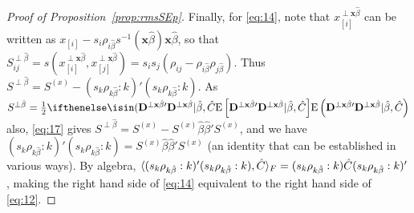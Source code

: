\documentclass{article}
\theoremstyle{remark}
\begin{document}
\begin{proof}[Proof of Proposition~\ref{prop:rmsSEp}]
Finally, for \eqref{eq:14}, note that $x_{[i]}^{\perp \mathbf{x}\hat\beta}$ can be written as  $x_{[i]} - s_{i}\rho_{i\hat\beta}s^{-1}(\mathbf{x}\hat\beta) \mathbf{x}\hat\beta $, so that  $S^{\perp \hat{\beta}}_{ij} =
 s(x_{[i]}^{\perp \mathbf{x}\hat\beta}, x_{[j]}^{\perp \mathbf{x}\hat\beta}) = s_{i} s_{j} (\rho_{ij} - \rho_{i\hat\beta}\rho_{j\hat\beta})$.  Thus $S^{\perp \hat{\beta}} = S^{(x)} - (s_{k} \rho_{k \hat\beta}: k )' (s_{k} \rho_{k \hat\beta}: k) $.  As $S^{\perp \hat{\beta}} = \frac{1}{2}\E{\mathbf{D}^{\perp \mathbf{x}\hat{\beta}\prime}\mathbf{D}^{\perp \mathbf{x}\hat{\beta}} | \hat\beta, \hat{C}}$ also, \eqref{eq:17} gives $S^{\perp \hat{\beta}} = S^{(x)} - S^{(x)}\hat\beta\hat\beta'S^{(x)} $, and we have $ (s_{k} \rho_{k \hat\beta}: k )' (s_{k} \rho_{k \hat\beta}: k)= S^{(x)}\hat\beta\hat\beta'S^{(x)} $
(an identity that can be established in various ways).  By algebra, $\langle (s_{k} \rho_{k \hat\beta}: k )' (s_{k} \rho_{k \hat\beta}: k), \hat{C}\rangle_{F} = (s_{k} \rho_{k \hat\beta}: k )\hat{C} (s_{k} \rho_{k \hat\beta}: k)'$, making
the right hand side of \eqref{eq:14} equivalent to the right hand side of \eqref{eq:12}.
\end{proof}








\appendix
\end{document}
